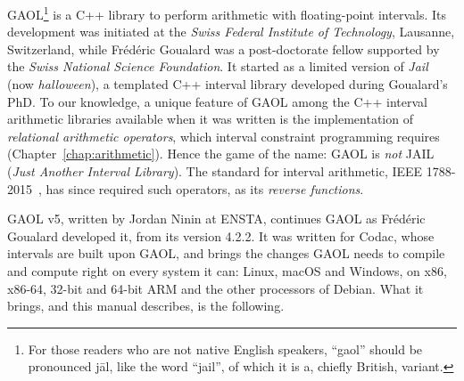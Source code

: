 \documentclass[12pt,a4paper,twoside,openright]{book}
\begin{document}
\medskip
GAOL\footnote{For those readers who are not native English speakers,
``gaol'' should be pronounced \textsf{j\={a}l}, like the word ``jail'', of
which it is a, chiefly British, variant.}
%
is a C++ library to perform arithmetic with floating-point intervals. Its
development was initiated at the \emph{Swiss Federal Institute of
Technology}, Lausanne, Switzerland, while Fr\'ed\'eric Goualard was a
post-doctorate fellow supported by the \emph{Swiss National Science
Foundation}. It started as a limited version of \emph{Jail} (now
\emph{halloween}), a templated C++ interval library developed during
Goualard's PhD. To our knowledge, a unique feature of GAOL among the C++
interval arithmetic libraries available when it was written is the
implementation of \emph{relational arithmetic operators}, which interval
constraint programming requires (Chapter~\ref{chap:arithmetic}).
%
Hence the game of the name: GAOL is \emph{not} JAIL (\emph{Just Another
Interval Library}). The standard for interval arithmetic, IEEE
1788-2015~\cite{IEEE1788:2015}, has since required such operators, as its
\emph{reverse functions}.
%

\medskip
GAOL v5, written by Jordan Ninin at ENSTA, continues GAOL as Fr\'ed\'eric
Goualard developed it, from its version 4.2.2. It was written for Codac,
whose intervals are built upon GAOL, and brings the changes GAOL needs to
compile and compute right on every system it can: Linux, macOS and Windows,
on x86, x86-64, 32-bit and 64-bit ARM and the other processors of Debian.
%
What it brings, and this manual describes, is the following.
\end{document}
